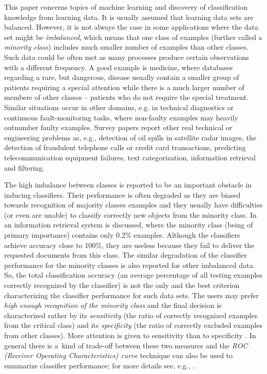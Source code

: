 \documentclass{AIMeth05}
\begin{document}
This paper concerns topics of machine learning and discovery of
classification knowledge from learning data. It is usually assumed that
learning data sets are balanced. However, it is not always the case in some
applications where the data set might be {\em imbalanced}, which means that
one class of examples (further called a {\em minority class}) includes much
smaller number of examples than other classes.  Such data could be often met
as many processes produce certain observations with a different frequency. A
good example is medicine, where databases regarding a rare, but dangerous,
disease usually contain a smaller group of patients requiring a special
attention while there is a much larger number of members of other classes --
patients who do not require the special treatment. Similar situations occur
in other domains, e.g. in technical diagnostics or continuous
fault-monitoring tasks, where non-faulty examples may heavily outnumber
faulty examples. Survey papers \cite{Gary,Smote} report other real technical
or engineering problems as, e.g., detection of oil spills in satellite radar
images, the detection of fraudulent telephone calls or credit card
transactions, predicting telecommunication equipment failures, text
categorization, information retrieval and filtering.

The high imbalance between classes is reported to be an important obstacle
in inducing classifiers. Their performance is often degraded as they are
biased towards recognition of majority classes examples and they usually
have difficulties (or even are unable) to classify correctly new objects
from the minority class.  In \cite{Lewis} an information retrieval system is
discussed, where the minority class (being of primary importance) contains
only 0.2\% examples. Although the classifiers achieve accuracy close to
100\%, they are useless because they fail to deliver the requested documents
from this class. The similar degradation of the classifier performance for
the minority classes is also reported for other imbalanced data. So, the
total classification accuracy (an average percentage of all testing examples
correctly recognized by the classifier)  is not the only and the best
criterion characterizing the classifier performance for such data sets. The
users may prefer {\em high enough recognition of the minority class} and the
final decision is characterized rather by its {\em sensitivity} (the ratio
of correctly recognized examples from the critical class) and its {\em
specificity} (the ratio of correctly excluded examples from other classes).
More attention is given to sensitivity than to specificity
\cite{Grzymala00}. In general there is a~kind of trade-off between these two
measures and the {\em ROC (Receiver Operating Characteristics) curve}
technique can also be used to summarize classifier performance; for more
details see, e.g., \cite{Smote,Gary}.
\end{document}
